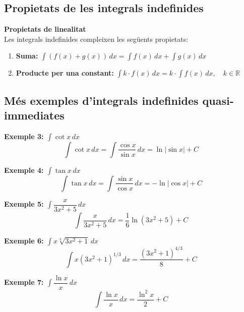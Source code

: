 \documentclass[12pt]{article}
\begin{document}
\subsection{Propietats de les integrals indefinides}

\begin{concept}
\textbf{Propietats de linealitat}\\
Les integrals indefinides compleixen les següents propietats:

\begin{enumerate}
    \item \textbf{Suma:} $\displaystyle \int (f(x) + g(x))\,dx = \int f(x)\,dx + \int g(x)\,dx$
    \item \textbf{Producte per una constant:} $\displaystyle \int k \cdot f(x)\,dx = k \cdot \int f(x)\,dx, \quad k \in \mathbb{R}$
\end{enumerate}
\end{concept}

\subsection{Més exemples d'integrals indefinides quasi-immediates}

\begin{exemple}
\textbf{Exemple 3: $\displaystyle \int \cot x\,dx$}\\
\[
\int \cot x\,dx = \int \dfrac{\cos x}{\sin x}\,dx = \ln|\sin x| + C
\]
\end{exemple}

\begin{exemple}
\textbf{Exemple 4: $\displaystyle \int \tan x\,dx$}\\
\[
\int \tan x\,dx = \int \dfrac{\sin x}{\cos x}\,dx = -\ln|\cos x| + C
\]
\end{exemple}

\begin{exemple}
\textbf{Exemple 5: $\displaystyle \int \dfrac{x}{3x^2+5}\,dx$}\\
\[
\int \dfrac{x}{3x^2+5}\,dx = \dfrac{1}{6} \ln(3x^2+5) + C
\]
\end{exemple}

\begin{exemple}
\textbf{Exemple 6: $\displaystyle \int x \sqrt[3]{3x^2+1}\,dx$}\\
\[
\int x (3x^2+1)^{1/3}\,dx = \dfrac{(3x^2+1)^{4/3}}{8} + C
\]
\end{exemple}

\begin{exemple}
\textbf{Exemple 7: $\displaystyle \int \dfrac{\ln x}{x}\,dx$}\\
\[
\int \dfrac{\ln x}{x}\,dx = \dfrac{\ln^2 x}{2} + C
\]
\end{exemple}
\end{document}
